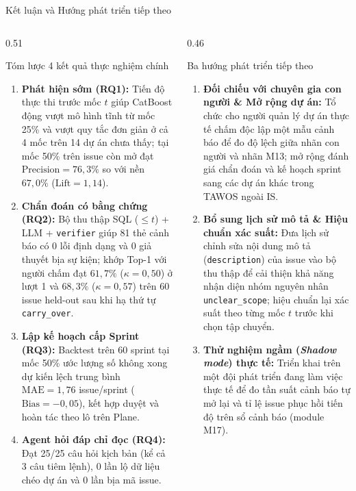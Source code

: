 \begin{frame}{Kết luận và Hướng phát triển tiếp theo}
  \scriptsize
  \begin{columns}[T,onlytextwidth]
    \begin{column}{0.51\textwidth}
      \begin{block}{Tóm lược 4 kết quả thực nghiệm chính}
        \begin{enumerate}
          \setlength{\itemsep}{3pt}
          \item \textbf{Phát hiện sớm (RQ1):} Tiến độ thực thi trước mốc $t$ giúp CatBoost động vượt mô hình tĩnh từ mốc 25\% và vượt quy tắc đơn giản ở cả 4 mốc trên 14 dự án chưa thấy; tại mốc 50\% trên issue còn mở đạt $\text{Precision} = 76{,}3\%$ so với nền $67{,}0\%$ ($\text{Lift} = 1{,}14$).
          \item \textbf{Chẩn đoán có bằng chứng (RQ2):} Bộ thu thập SQL ($\le t$) + LLM + \texttt{verifier} giúp 81 thẻ cảnh báo có 0 lỗi định dạng và 0 giả thuyết bịa sự kiện; khớp Top-1 với người chấm đạt $61{,}7\%$ ($\kappa = 0{,}50$) ở lượt 1 và $68{,}3\%$ ($\kappa = 0{,}57$) trên 60 issue held-out sau khi hạ thứ tự \texttt{carry\_over}.
          \item \textbf{Lập kế hoạch cấp Sprint (RQ3):} Backtest trên 60 sprint tại mốc 50\% ước lượng số không xong dự kiến lệch trung bình $\text{MAE} = 1{,}76$ issue/sprint ($\text{Bias} = -0{,}05$), kết hợp duyệt và hoàn tác theo lô trên Plane.
          \item \textbf{Agent hỏi đáp chỉ đọc (RQ4):} Đạt 25/25 câu hỏi kịch bản (kể cả 3 câu tiêm lệnh), 0 lần lộ dữ liệu chéo dự án và 0 lần bịa mã issue.
        \end{enumerate}
      \end{block}
    \end{column}
    \begin{column}{0.46\textwidth}
      \begin{alertblock}{Ba hướng phát triển tiếp theo}
        \begin{enumerate}
          \setlength{\itemsep}{3.5pt}
          \item \textbf{Đối chiếu với chuyên gia con người \& Mở rộng dự án:} Tổ chức cho người quản lý dự án thực tế chấm độc lập một mẫu cảnh báo để đo độ lệch giữa nhãn con người và nhãn M13; mở rộng đánh giá chẩn đoán và kế hoạch sprint sang các dự án khác trong TAWOS ngoài IS.
          \item \textbf{Bổ sung lịch sử mô tả \& Hiệu chuẩn xác suất:} Đưa lịch sử chỉnh sửa nội dung mô tả (\texttt{description}) của issue vào bộ thu thập để cải thiện khả năng nhận diện nhóm nguyên nhân \texttt{unclear\_scope}; hiệu chuẩn lại xác suất theo từng mốc $t$ trước khi chọn tập chuyển.
          \item \textbf{Thử nghiệm ngầm (\emph{Shadow mode}) thực tế:} Triển khai trên một đội phát triển đang làm việc thực tế để đo tần suất cảnh báo tự mở lại và tỉ lệ issue phục hồi tiến độ trên sổ cảnh báo (module M17).
        \end{enumerate}
      \end{alertblock}
    \end{column}
  \end{columns}
\end{frame}

